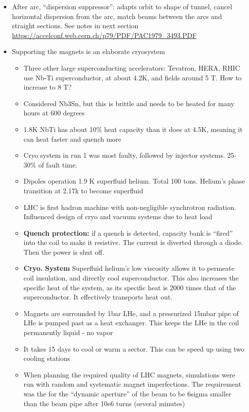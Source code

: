 \begin{itemize}
    \item After arc, ``dispersion suppressor'': adapts orbit to shape of tunnel, cancel horizontal dispersion from the arc, match beams between the arcs and straight sections. {\color{blue} See notes in next section \url{https://accelconf.web.cern.ch/p79/PDF/PAC1979_3493.PDF}} \cite{lyndon}
    \item Supporting the magnets is an elaborate cryosystem
    \begin{itemize}\scriptsize
        \item Three other large superconducting accelerators: Tevatron, HERA, RHIC use Nb-Ti superconductor, at about 4.2K, and fields around 5 T. How to increase to 8 T? \cite{lyndon}
        \item Considered Nb3Sn, but this is brittle and needs to be heated for many hours at 600 degrees \cite{lyndon}
        \item 1.8K NbTi has about 10\% heat capacity than it does at 4.5K, meaning it can heat faster and quench more \cite{lyndon}
        \item Cryo system in run 1 was most faulty, followed by injector systems. 25-30\% of fault time. \cite{lhcRun1}
        \item Dipoles operation 1.9 K superfluid helium. Total 100 tons. Helium's phase transition at 2.17k to become superfluid \cite{lyndon}
        \item LHC is first hadron machine with non-negligible synchrotron radiation. Influenced design of cryo and vacuum systems due to heat load \cite{lyndon}
        \item \textbf{Quench protection:} if a quench is detected, capacity bank is ``fired'' into the coil to make it resistive. The current is diverted through a diode. Then the power is shut off. \cite{lyndon}
        \item \textbf{Cryo. System} Superfluid helium's low viscosity allows it to permeate coil insulation, and directly cool superconductor. This also increases the specific heat of the system, as its specific heat is 2000 times that of the superconductor. It effectively transports heat out. \cite{lyndon}
        \item Magnets are surrounded by 1bar LHe, and a pressurized 15mbar pipe of LHe is pumped past as a heat exchanger. This keeps the LHe in the coil permanently liquid - no vapor \cite{lyndon}
        \item It takes 15 days to cool or warm a sector. This can be speed up using two cooling stations \cite{lyndon}
        \item When planning the required quality of LHC magnets, simulations were run with random and systematic magnet imperfections. The requirement was the for the ``dynamic aperture'' of the beam to be 6sigma smaller than the beam pipe after 10e6 turns (several minutes) \cite{lyndon}
    \end{itemize}
\end{itemize}

